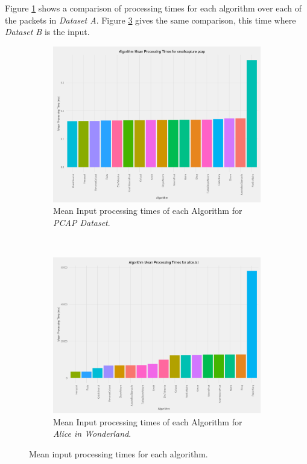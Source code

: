 \documentclass[9pt, conference]{IEEEtran}
\begin{document}
Figure \ref{figure-barmeanprocessingsmallcapture} shows a comparison of processing times for each algorithm over each of the packets in \textit{Dataset A}. Figure \ref{figure-barmeanprocessingalice} gives the same comparison, this time where \textit{Dataset B} is the input.

\begin{figure}[!htb]
    \centering
    \begin{subfigure}[b]{\columnwidth}
        \centering
        \includegraphics[width=\textwidth]{images/bar_graph_mean_one_input_smallcapture_pcap}
        \caption{Mean Input processing times of each Algorithm for \textit{PCAP Dataset}.}
        \label{figure-barmeanprocessingsmallcapture}
    \end{subfigure}
    ~
    \begin{subfigure}[b]{\columnwidth}
        \centering
        \includegraphics[width=\textwidth]{images/bar_graph_mean_one_input_alice_txt} 
        \caption{Mean Input processing times of each Algorithm for \textit{Alice in Wonderland}.}
        \label{figure-barmeanprocessingalice}
    \end{subfigure}
    \caption{Mean input processing times for each algorithm.}
\end{figure}
\end{document}

